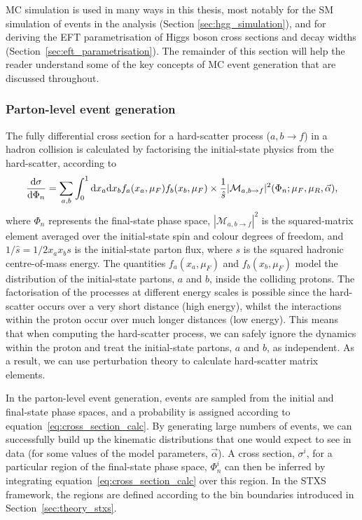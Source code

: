 MC simulation is used in many ways in this thesis, most notably for the SM simulation of events in the \Hgg analysis (Section \ref{sec:hgg_simulation}), and for deriving the EFT parametrisation of Higgs boson cross sections and decay widths (Section~\ref{sec:eft_parametrisation}). The remainder of this section will help the reader understand some of the key concepts of MC event generation that are discussed throughout.

\subsubsection{Parton-level event generation}
The fully differential cross section for a hard-scatter process ($a,b \rightarrow f$) in a hadron collision is calculated by factorising the initial-state physics from the hard-scatter, according to
\begin{equation}\label{eq:cross_section_calc}
    \frac{{\rm{d}}\sigma}{{\rm{d}}\Phi_n} = \sum_{a,b} \int^1_0 {\rm{d}}x_a {\rm{d}}x_b f_a(x_a,\mu_F) f_b(x_b,\mu_F) \times \frac{1}{\hat{s}}|\mathcal{M}_{a,b\rightarrow f}|^2(\Phi_n;\mu_F,\mu_R,\vec{\alpha}),
\end{equation}
\noindent
where $\Phi_n$ represents the final-state phase space, $|\mathcal{M}_{a,b\rightarrow f}|^2$ is the squared-matrix element averaged over the initial-state spin and colour degrees of freedom, and $1/\hat{s}=1/2x_ax_bs$ is the initial-state parton flux, where $s$ is the squared hadronic centre-of-mass energy. The quantities $f_{a}(x_a,\mu_F)$ and $f_{b}(x_b,\mu_F)$ model the distribution of the initial-state partons, $a$ and $b$, inside the colliding protons. The factorisation of the processes at different energy scales is possible since the hard-scatter occurs over a very short distance (high energy), whilst the interactions within the proton occur over much longer distances (low energy). This means that when computing the hard-scatter process, we can safely ignore the dynamics within the proton and treat the initial-state partons, $a$ and $b$, as independent. As a result, we can use perturbation theory to calculate hard-scatter matrix elements.

In the parton-level event generation, events are sampled from the initial and final-state phase spaces, and a probability is assigned according to equation~\ref{eq:cross_section_calc}. By generating large numbers of events, we can successfully build up the kinematic distributions that one would expect to see in data (for some values of the model parameters, $\vec{\alpha}$). A cross section, $\sigma^i$, for a particular region of the final-state phase space, $\Phi^i_n$ can then be inferred by integrating equation~\ref{eq:cross_section_calc} over this region. In the STXS framework, the regions are defined according to the bin boundaries introduced in Section~\ref{sec:theory_stxs}.

